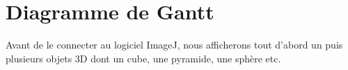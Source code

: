 \documentclass[11pt]{report}
\begin{document}
\chapter{Diagramme de Gantt} %
 Avant de le connecter au logiciel ImageJ, nous afficherons tout d'abord un puis plusieurs objets 3D dont un cube, une pyramide, une sphère etc.  
\end{document}
